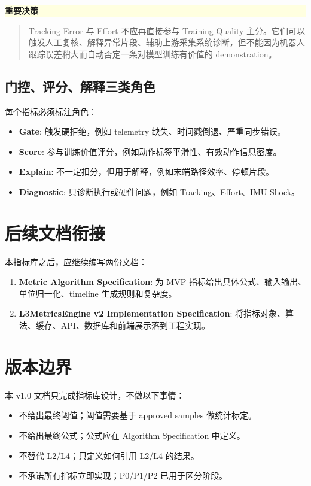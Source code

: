 \documentclass[UTF8,zihao=-4,oneside,openany]{ctexrep}
\newcommand{\Term}[1]{\textbf{#1}}
\newenvironment{warningbox}[1]{\vspace{0.5em}\noindent\colorbox{LightYellow}{\parbox{0.96\linewidth}{\textbf{#1}}}\par\vspace{-0.2em}\begin{quote}\small}{\end{quote}\vspace{0.3em}}
\begin{document}
\begin{warningbox}{重要决策}
Tracking Error 与 Effort 不应再直接参与 Training Quality 主分。它们可以触发人工复核、解释异常片段、辅助上游采集系统诊断，但不能因为机器人跟踪误差稍大而自动否定一条对模型训练有价值的 demonstration。
\end{warningbox}

\subsection{门控、评分、解释三类角色}

每个指标必须标注角色：

\begin{itemize}
  \item \Term{Gate}: 触发硬拒绝，例如 telemetry 缺失、时间戳倒退、严重同步错误。
  \item \Term{Score}: 参与训练价值评分，例如动作标签平滑性、有效动作信息密度。
  \item \Term{Explain}: 不一定扣分，但用于解释，例如末端路径效率、停顿片段。
  \item \Term{Diagnostic}: 只诊断执行或硬件问题，例如 Tracking、Effort、IMU Shock。
\end{itemize}

\section{后续文档衔接}

本指标库之后，应继续编写两份文档：

\begin{enumerate}
  \item \Term{Metric Algorithm Specification}: 为 MVP 指标给出具体公式、输入输出、单位归一化、timeline 生成规则和复杂度。
  \item \Term{L3MetricsEngine v2 Implementation Specification}: 将指标对象、算法、缓存、API、数据库和前端展示落到工程实现。
\end{enumerate}

\section{版本边界}

本 v1.0 文档只完成指标库设计，不做以下事情：

\begin{itemize}
  \item 不给出最终阈值；阈值需要基于 approved samples 做统计标定。
  \item 不给出最终公式；公式应在 Algorithm Specification 中定义。
  \item 不替代 L2/L4；只定义如何引用 L2/L4 的结果。
  \item 不承诺所有指标立即实现；P0/P1/P2 已用于区分阶段。
\end{itemize}
\end{document}
